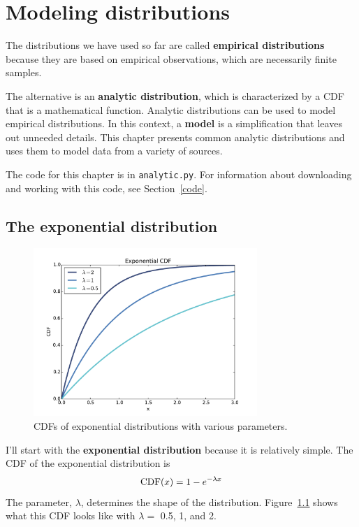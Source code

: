 \documentclass[12pt]{book}
\begin{document}
\chapter{Modeling distributions}
\label{modeling}

The distributions we have used so far are called {\bf empirical
  distributions} because they are based on empirical observations,
which are necessarily finite samples.

The alternative is an {\bf analytic distribution}, which is
characterized by a CDF that is a mathematical function.
Analytic distributions can be used to model empirical distributions.
In this context, a {\bf model} is a simplification that leaves out
unneeded details.  This chapter presents common analytic distributions
and uses them to model data from a variety of sources.

The code for this chapter is in {\tt analytic.py}.  For information
about downloading and working with this code, see Section~\ref{code}.



\section{The exponential distribution}
\label{exponential}

\begin{figure}
\centerline{\includegraphics[height=2.5in]{figs/analytic_expo_cdf.pdf}}
\caption{CDFs of exponential distributions with various parameters.}
\label{analytic_expo_cdf}
\end{figure}

I'll start with the {\bf exponential distribution} because it is
relatively simple.  The CDF of the exponential distribution is
%
\[ \mathrm{CDF}(x) = 1 - e^{-\lambda x} \]
%
The parameter, $\lambda$, determines the shape of the distribution.
Figure~\ref{analytic_expo_cdf} shows what this CDF looks like with
$\lambda = $ 0.5, 1, and 2.
\end{document}

